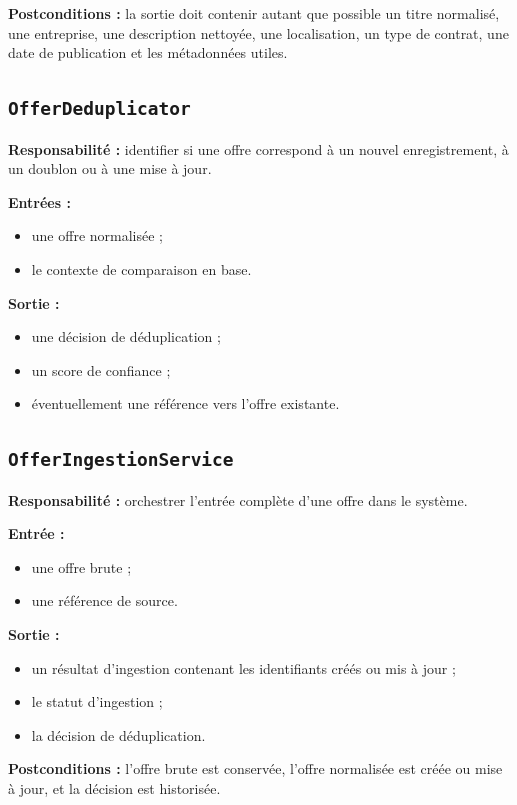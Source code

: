 \documentclass[11pt,a4paper]{article}
\begin{document}
\textbf{Postconditions :}
la sortie doit contenir autant que possible un titre normalisé, une entreprise, une description nettoyée, une localisation, un type de contrat, une date de publication et les métadonnées utiles.

\subsection{\texttt{OfferDeduplicator}}

\textbf{Responsabilité :} identifier si une offre correspond à un nouvel enregistrement, à un doublon ou à une mise à jour.

\textbf{Entrées :}
\begin{itemize}
    \item une offre normalisée ;
    \item le contexte de comparaison en base.
\end{itemize}

\textbf{Sortie :}
\begin{itemize}
    \item une décision de déduplication ;
    \item un score de confiance ;
    \item éventuellement une référence vers l’offre existante.
\end{itemize}

\subsection{\texttt{OfferIngestionService}}

\textbf{Responsabilité :} orchestrer l’entrée complète d’une offre dans le système.

\textbf{Entrée :}
\begin{itemize}
    \item une offre brute ;
    \item une référence de source.
\end{itemize}

\textbf{Sortie :}
\begin{itemize}
    \item un résultat d’ingestion contenant les identifiants créés ou mis à jour ;
    \item le statut d’ingestion ;
    \item la décision de déduplication.
\end{itemize}

\textbf{Postconditions :}
l’offre brute est conservée, l’offre normalisée est créée ou mise à jour, et la décision est historisée.
\end{document}
